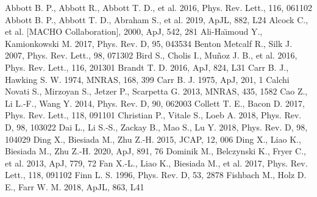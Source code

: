 \documentclass[useAMS,usenatbib,usegraphicx]{mn2e}
\begin{document}
\begin{thebibliography}{}
 Abbott B. P., Abbott R., Abbott T. D., et al. 2016, Phys. Rev. Lett., 116, 061102
 Abbott B. P., Abbott T. D., Abraham S., et al. 2019, ApJL, 882, L24
 Alcock C., et al. [MACHO Collaboration], 2000, ApJ, 542, 281
  Ali-Ha\"{\i}moud Y., Kamionkowski M. 2017, Phys. Rev. D, 95, 043534
 Benton Metcalf R., Silk J. 2007, Phys. Rev. Lett., 98, 071302
 Bird S., Cholis I., Mu\~noz J. B., et al. 2016, Phys. Rev. Lett., 116, 201301
 Brandt T. D. 2016, ApJ, 824, L31
 Carr B. J., Hawking S. W. 1974, MNRAS, 168, 399
 Carr B. J. 1975, ApJ, 201, 1
 Calchi Novati S., Mirzoyan S., Jetzer P., Scarpetta G. 2013, MNRAS, 435, 1582
 Cao Z., Li L.-F., Wang Y. 2014, Phys. Rev. D, 90, 062003
 Collett T. E., Bacon D. 2017, Phys. Rev. Lett., 118, 091101
 Christian P., Vitale S., Loeb A. 2018, Phys. Rev. D, 98, 103022
 Dai L., Li S.-S., Zackay B., Mao S., Lu Y. 2018, Phys. Rev. D, 98, 104029
 Ding X., Biesiada M., Zhu Z.-H. 2015, JCAP, 12, 006
 Ding X., Liao K., Biesiada M., Zhu Z.-H. 2020, ApJ, 891, 76
 Dominik M., Belczynski K., Fryer C., et al. 2013, ApJ, 779, 72
 Fan X.-L., Liao K., Biesiada M.,  et al. 2017, Phys. Rev. Lett., 118, 091102
 Finn L. S. 1996, Phys. Rev. D, 53, 2878
Fishbach M., Holz D. E., Farr W. M. 2018, ApJL, 863, L41

\end{thebibliography}
\end{document}
